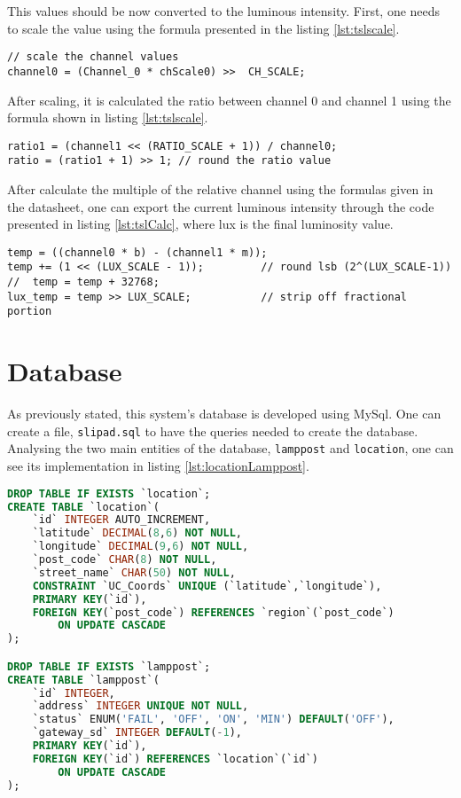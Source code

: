 This values should be now converted to the luminous intensity. First, one needs to scale the value using the formula presented in the listing \ref{lst:tslscale}.

\begin{lstlisting}[caption={TSL2581 Channel 0 scaling.}, label={lst:tslscale}]
// scale the channel values
channel0 = (Channel_0 * chScale0) >>  CH_SCALE;
\end{lstlisting}

After scaling, it is calculated the ratio between channel 0 and channel 1 using the formula shown in listing \ref{lst:tslscale}.

\begin{lstlisting}[caption={TSL2581 ratio calculation.}, label={lst:tslratio}]
ratio1 = (channel1 << (RATIO_SCALE + 1)) / channel0;
ratio = (ratio1 + 1) >> 1; // round the ratio value
\end{lstlisting}

After calculate the multiple of the relative channel using the formulas given in the datasheet, one can export the current luminous intensity through the code presented in listing \ref{lst:tslCalc}, where lux is the final luminosity value. 

\begin{lstlisting}[caption={TSL2581 luminosity value calculation.}, label={lst:tslCalc}]
temp = ((channel0 * b) - (channel1 * m));
temp += (1 << (LUX_SCALE - 1));			// round lsb (2^(LUX_SCALE-1))
//  temp = temp + 32768;
lux_temp = temp >> LUX_SCALE;			// strip off fractional portion
\end{lstlisting}

\clearpage
\section{Database}
As previously stated, this system's database is developed using MySql. One can create a file, \verb|slipad.sql| to have the queries needed to create the database. Analysing the two main entities of the database, \verb|lamppost| and \verb|location|, one can see its implementation in listing \ref{lst:locationLamppost}.

\begin{lstlisting}[language=SQL, caption={Queries to create tables location and lamppost.}, label={lst:locationLamppost}]
DROP TABLE IF EXISTS `location`;
CREATE TABLE `location`(
	`id` INTEGER AUTO_INCREMENT,
	`latitude` DECIMAL(8,6) NOT NULL,
	`longitude` DECIMAL(9,6) NOT NULL,
	`post_code` CHAR(8) NOT NULL,
	`street_name` CHAR(50) NOT NULL,
	CONSTRAINT `UC_Coords` UNIQUE (`latitude`,`longitude`),
	PRIMARY KEY(`id`),
	FOREIGN KEY(`post_code`) REFERENCES `region`(`post_code`)
		ON UPDATE CASCADE
);

DROP TABLE IF EXISTS `lamppost`;
CREATE TABLE `lamppost`(
	`id` INTEGER,
	`address` INTEGER UNIQUE NOT NULL,
	`status` ENUM('FAIL', 'OFF', 'ON', 'MIN') DEFAULT('OFF'),
	`gateway_sd` INTEGER DEFAULT(-1),
	PRIMARY KEY(`id`),
	FOREIGN KEY(`id`) REFERENCES `location`(`id`)
		ON UPDATE CASCADE
);
\end{lstlisting}

